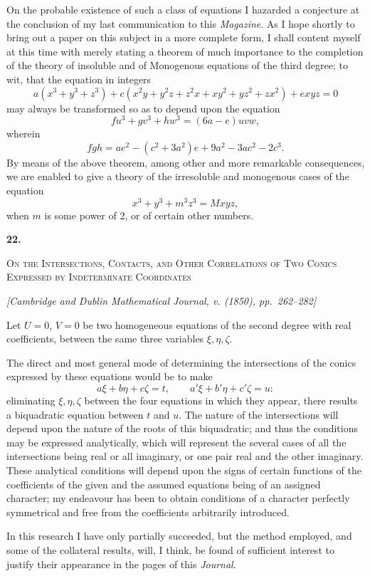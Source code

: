 \documentclass[11pt]{article}
\newcommand{\paperhead}[3]{%
  \clearpage
  \begin{center}
  {\Large\bfseries #1.}\par\vspace{0.85em}
  {\large\scshape #2}\par\vspace{0.6em}
  {\itshape [#3]}\par
  \end{center}\vspace{0.4em}}
\newcommand{\sourcepage}[1]{\marginpar{\scriptsize p.~#1}}
\begin{document}
{{\sourcepage{118}
On the probable existence of such a class of equations I hazarded a conjecture at the conclusion of my last communication to this \emph{Magazine}. As I hope shortly to bring out a paper on this subject in a more complete form, I shall content myself at this time with merely stating a theorem of much importance to the completion of the theory of insoluble and of Monogenous equations of the third degree; to wit, that the equation in integers
\[
a(x^3+y^3+z^3)+c(x^2y+y^2z+z^2x+xy^2+yz^2+zx^2)+exyz=0
\]
may always be transformed so as to depend upon the equation
\[
fu^3+gv^3+hw^3=(6a-e)uvw,
\]
wherein
\[
fgh=ae^2-(c^2+3a^2)e+9a^2-3ac^2-2c^3.
\]
By means of the above theorem, among other and more remarkable consequences, we are enabled to give a theory of the irresoluble and monogenous cases of the equation
\[
x^3+y^3+m^3z^3=Mxyz,
\]
when $m$ is some power of 2, or of certain other numbers.




\paperhead{22}{On the Intersections, Contacts, and Other Correlations of Two Conics Expressed by Indeterminate Coordinates}{Cambridge and Dublin Mathematical Journal, v. (1850), pp.~262--282}

\sourcepage{119}
Let $U=0$, $V=0$ be two homogeneous equations of the second degree with real coefficients, between the same three variables $\xi,\eta,\zeta$.

The direct and most general mode of determining the intersections of the conics expressed by these equations would be to make
\[
a\xi+b\eta+c\zeta=t,\qquad
a'\xi+b'\eta+c'\zeta=u:
\]
eliminating $\xi,\eta,\zeta$ between the four equations in which they appear, there results a biquadratic equation between $t$ and $u$. The nature of the intersections will depend upon the nature of the roots of this biquadratic; and thus the conditions may be expressed analytically, which will represent the several cases of all the intersections being real or all imaginary, or one pair real and the other imaginary. These analytical conditions will depend upon the signs of certain functions of the coefficients of the given and the assumed equations being of an assigned character; my endeavour has been to obtain conditions of a character perfectly symmetrical and free from the coefficients arbitrarily introduced.

In this research I have only partially succeeded, but the method employed, and some of the collateral results, will, I think, be found of sufficient interest to justify their appearance in the pages of this \emph{Journal}.

}}
\end{document}
